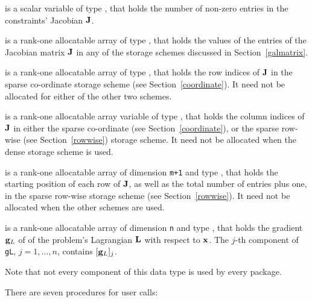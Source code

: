 \documentclass{galahad}
\begin{document}
\begin{description}
 is a scalar variable of type \integer, 
that holds the number of non-zero entries in the 
constraints' Jacobian ${\mathbf{J}}$.

 is a rank-one allocatable array of type \realdp, that holds
the values of the entries of the Jacobian matrix ${\mathbf{J}}$ in any of the 
storage schemes discussed in Section~\ref{galmatrix}.

 is a rank-one allocatable array of type \integer,
that holds the row indices of ${\mathbf{J}}$ in the sparse co-ordinate storage
scheme (see Section~\ref{coordinate}). 
It need not be allocated for either of the other two schemes.

 is a rank-one allocatable array variable of type \integer,
that holds the column indices of ${\mathbf{J}}$ in either the sparse co-ordinate 
(see Section~\ref{coordinate}), or the sparse row-wise 
(see Section~\ref{rowwise}) storage scheme.
It need not be allocated when the dense storage scheme is used.

 is a rank-one allocatable array of dimension {\tt m+1} and type 
\integer, that holds the 
starting position of each row of ${\mathbf{J}}$, as well
as the total number of entries plus one, in the sparse row-wise storage
scheme (see Section~\ref{rowwise}). It need not be allocated when the
other schemes are used.

 is a rank-one allocatable array of dimension {\tt n} and type 
\realdp, that holds the gradient ${\mathbf{g}}_L$ 
of of the problem's Lagrangian ${\mathbf{L}}$ with respect to ${\mathbf{x}}$.
The $j$-th component of 
{\tt gL}, $j = 1,  \ldots ,  n$, contains $[{\mathbf{g}}_L]_{j}$.

\end{description}

\noindent
Note that not every component of this data type is used by every package.


\galarguments
There are seven procedures for user calls:
\end{document}

